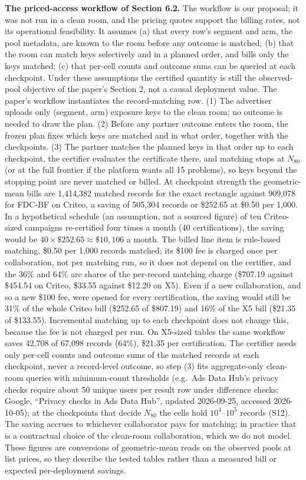 \documentclass[sigconf,anonymous,review]{acmart}
\begin{document}
\textbf{The priced-access workflow of Section 6.2.} The workflow is our proposal; it was not run in a clean room, and the pricing quotes support the billing rates, not its operational feasibility. It assumes (a) that every row's segment and arm, the pool metadata, are known to the room before any outcome is matched; (b) that the room can match keys selectively and in a planned order, and bills only the keys matched; (c) that per-cell counts and outcome sums can be queried at each checkpoint. Under these assumptions the certified quantity is still the observed-pool objective of the paper's Section 2, not a causal deployment value. The paper's workflow instantiates the record-matching row. (1) The advertiser uploads only (segment, arm) exposure keys to the clean room; no outcome is needed to draw the plan. (2) Before any partner outcome enters the room, the frozen plan fixes which keys are matched and in what order, together with the checkpoints. (3) The partner matches the planned keys in that order up to each checkpoint, the certifier evaluates the certificate there, and matching stops at $N_{80}$ (or at the full frontier if the platform wants all 15 problems), so keys beyond the stopping point are never matched or billed. At checkpoint strength the geometric-mean bills are 1,414,382 matched records for the exact rectangle against 909,078 for FDC-BF on Criteo, a saving of 505,304 records or \$252.65 at \$0.50 per 1,000. In a hypothetical schedule (an assumption, not a sourced figure) of ten Criteo-sized campaigns re-certified four times a month (40 certifications), the saving would be $40 \times \$252.65 \approx \$10{,}106$ a month. The billed line item is rule-based matching, \$0.50 per 1,000 records matched; its \$100 fee is charged once per collaboration, not per matching run, so it does not depend on the certifier, and the 36\% and 64\% are shares of the per-record matching charge (\$707.19 against \$454.54 on Criteo, \$33.55 against \$12.20 on X5). Even if a new collaboration, and so a new \$100 fee, were opened for every certification, the saving would still be 31\% of the whole Criteo bill (\$252.65 of \$807.19) and 16\% of the X5 bill (\$21.35 of \$133.55). Incremental matching up to each checkpoint does not change this, because the fee is not charged per run. On X5-sized tables the same workflow saves 42,708 of 67,098 records (64\%), \$21.35 per certification. The certifier needs only per-cell counts and outcome sums of the matched records at each checkpoint, never a record-level outcome, so step (3) fits aggregate-only clean-room queries with minimum-count thresholds (e.g.\ Ads Data Hub's privacy checks require about 50 unique users per result row under difference checks; Google, ``Privacy checks in Ads Data Hub'', updated 2026-09-25, accessed 2026-10-05); at the checkpoints that decide $N_{80}$ the cells hold $10^4$--$10^5$ records (S12). The saving accrues to whichever collaborator pays for matching; in practice that is a contractual choice of the clean-room collaboration, which we do not model. These figures are conversions of geometric-mean reads on the observed pools at list prices, so they describe the tested tables rather than a measured bill or expected per-deployment savings.
\end{document}
